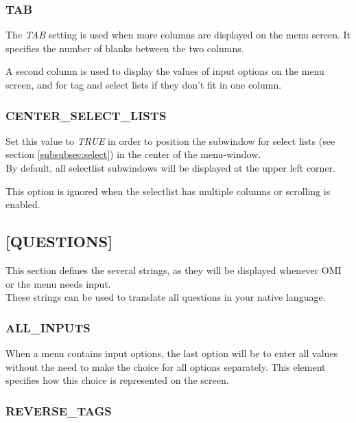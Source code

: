 \documentclass[a4paper]{book}
\begin{document}
\subsubsection{TAB}

The \textsl{TAB} setting is used when more columns are displayed on the menu screen. 
It specifies the number of blanks between the two columns.

A second column is used to display the values of input options on the menu 
screen, and for tag and select lists if they don't fit in one column.

\subsubsection{CENTER{\_}SELECT{\_}LISTS}

Set this value to \textsl{TRUE} in order to position the subwindow for select lists (see section \ref{subsubsec:select}) in the center of the menu-window.\\
By default, all selectlist subwindows will be displayed at the upper left corner.

This option is ignored when the selectlist has multiple columns or scrolling is enabled.

\subsection{[QUESTIONS]}
\label{subsubsec:mylabel18}

This section defines the several strings, as they will be displayed whenever 
OMI or the menu needs input. \\
These strings can be used to translate all questions in your native 
language.

\subsubsection{ALL{\_}INPUTS}
\label{para:mylabel3}

When a menu contains input options, the last option will be to enter all 
values without the need to make the choice for all options separately. This 
element specifies how this choice is represented on the screen.

\subsubsection{REVERSE{\_}TAGS}
\end{document}
